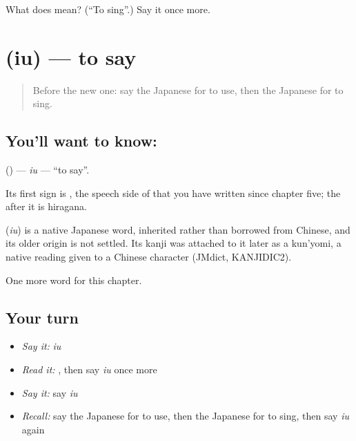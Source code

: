 \begin{tcolorbox}[breakable,colback=teal!4,colframe=teal!35!black,title={Before you move on}]
What does  mean? (\textquotedblleft{}To sing\textquotedblright{}.) Say it once more.
\end{tcolorbox}
\section[\texorpdfstring{\ja{言}\ja{う} (iu)}{言う (iu)}]{ (iu) — to say}

\label{lesson:JA-C28-iu}



\begin{quote}
Before the new one: say the Japanese for to use, then the Japanese for to sing.
\end{quote}

\subsection*{You'll want to know: }
\textbf{} () — \emph{iu} — \textquotedblleft{}to say\textquotedblright{}.

Its first sign is \textbf{}, the speech side of \textbf{} that you have written since chapter five; the \textbf{} after it is hiragana.

\begin{cousinweb}
\textbf{} (\emph{iu}) is a native Japanese word, inherited rather than borrowed from Chinese, and its older origin is not settled. Its kanji was attached to it later as a kun'yomi, a native reading given to a Chinese character (JMdict, KANJIDIC2).
\end{cousinweb}

\begin{grammarlens}[title={What you've built}]
One more word for this chapter.
\end{grammarlens}

\subsection*{Your turn}
\begin{itemize}
\raggedright
  \item \emph{Say it:} \emph{iu}
  \item \emph{Read it:} \textbf{}, then say \emph{iu} once more
  \item \emph{Say it:} say \emph{iu}
  \item \emph{Recall:} say the Japanese for to use, then the Japanese for to sing, then say \emph{iu} again
\end{itemize}

